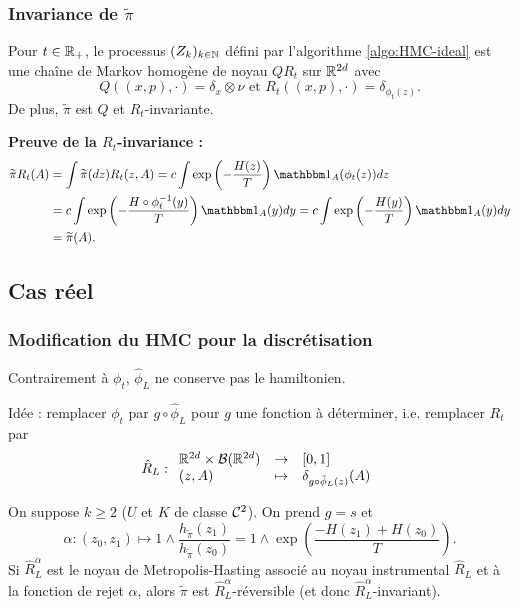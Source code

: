 \documentclass[10pt]{beamer}
\begin{document}
\begin{frame}
	\frametitle{Invariance de $\widetilde \pi$}
	\begin{Prop}
		Pour $t \in \mathbb{R}_+$, le processus $(Z_k)_{k \in \mathbb{N}}$ défini par l'algorithme \ref{algo:HMC-ideal} est une chaîne de Markov homogène de noyau $QR_t$ sur $\mathbb{R}^{2d}$ avec
		$$
		Q((x,p),\cdot) = \delta_x \otimes \nu \text{ et } R_t((x,p),\cdot) = \delta_{\phi_t(z)}.
		$$
		De plus, $\widetilde{\pi}$ est $Q$ et $R_t$-invariante. 
	\end{Prop}
	{\bf Preuve de la $R_t$-invariance :}
		{\small
		\begin{align*}
		\widetilde{\pi} R_t (A)
		&= \int \widetilde{\pi}(dz) R_t(z, A)
		= c \int \exp \left(-\frac{H(z)}{T} \right) \ind_A(\phi_t(z)) dz\\
		&= c \int \exp \left(-\frac{H \circ \phi_t^{-1}(y)}{T} \right) \ind_A(y) dy
		= c \int \exp \left(-\frac{H(y)}{T} \right) \ind_A(y) dy \\
		&= \widetilde{\pi}(A).
		\end{align*}
                }
	\null\hfill\qedsymbol
\end{frame}
 
\subsection{Cas réel}
 

\begin{frame}
	\frametitle{Modification du HMC pour la discrétisation}
	Contrairement à $\phi_t$, $\hat \phi_L$ ne conserve pas le hamiltonien.

	Idée : remplacer $\phi_t$ par $g \circ \hat \phi_L$ pour $g$ une fonction à déterminer, i.e. remplacer $R_t$ par
	$$
	\hat{R}_L : { \begin{array}{lcl} 
		\mathbb{R}^{2d} \times \mathcal{B}(\mathbb{R}^{2d}) & \to & [0,1] \\
		(z, A) & \mapsto & \delta_{g \circ \hat{\phi}_L(z)}(A)
	 \end{array} }
	$$

        \pause
	\begin{Prop}[réversibilité]\label{prop:rever_discret}
		On suppose $k \geq 2$ ($U$ et $K$ de classe $\mathcal{C}^2$). On prend $g = s$ et
		$$
		\alpha : (z_0,z_1) \mapsto 1 \wedge \frac{h_{\widetilde \pi}(z_1)}{h_{\widetilde \pi}(z_0)} = 1 \wedge \exp(\frac{-H(z_1)+H(z_0)}{T}).
		$$
		Si $\hat R_L^\alpha$ est le noyau de Metropolis-Hasting associé au noyau instrumental $\hat R_L$ et à la fonction de rejet $\alpha$, alors $\widetilde \pi$ est $\hat R_L^\alpha$-réversible (et donc $\hat R_L^\alpha$-invariant).
	\end{Prop}
\end{frame}
\end{document}
